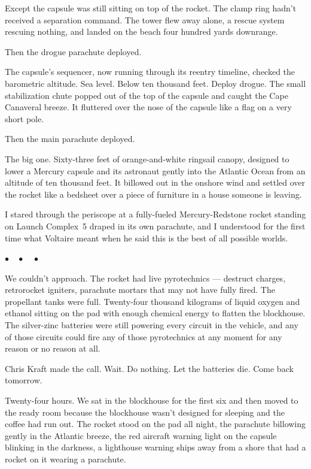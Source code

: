 \documentclass[12pt, letterpaper]{article}
\begin{document}
Except the capsule was still sitting on top of the rocket. The clamp ring hadn't received a separation command. The tower flew away alone, a rescue system rescuing nothing, and landed on the beach four hundred yards downrange.

Then the drogue parachute deployed.

The capsule's sequencer, now running through its reentry timeline, checked the barometric altitude. Sea level. Below ten thousand feet. Deploy drogue. The small stabilization chute popped out of the top of the capsule and caught the Cape Canaveral breeze. It fluttered over the nose of the capsule like a flag on a very short pole.

Then the main parachute deployed.

The big one. Sixty-three feet of orange-and-white ringsail canopy, designed to lower a Mercury capsule and its astronaut gently into the Atlantic Ocean from an altitude of ten thousand feet. It billowed out in the onshore wind and settled over the rocket like a bedsheet over a piece of furniture in a house someone is leaving.

I stared through the periscope at a fully-fueled Mercury-Redstone rocket standing on Launch Complex~5 draped in its own parachute, and I understood for the first time what Voltaire meant when he said this is the best of all possible worlds.

\begin{center}
$\bullet\quad\bullet\quad\bullet$
\end{center}

We couldn't approach. The rocket had live pyrotechnics --- destruct charges, retrorocket igniters, parachute mortars that may not have fully fired. The propellant tanks were full. Twenty-four thousand kilograms of liquid oxygen and ethanol sitting on the pad with enough chemical energy to flatten the blockhouse. The silver-zinc batteries were still powering every circuit in the vehicle, and any of those circuits could fire any of those pyrotechnics at any moment for any reason or no reason at all.

Chris Kraft made the call. Wait. Do nothing. Let the batteries die. Come back tomorrow.

Twenty-four hours. We sat in the blockhouse for the first six and then moved to the ready room because the blockhouse wasn't designed for sleeping and the coffee had run out. The rocket stood on the pad all night, the parachute billowing gently in the Atlantic breeze, the red aircraft warning light on the capsule blinking in the darkness, a lighthouse warning ships away from a shore that had a rocket on it wearing a parachute.
\end{document}
